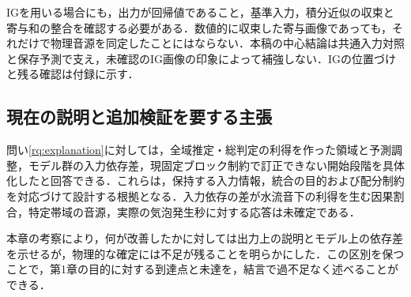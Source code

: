 IG\cite{sundararajan2017}を用いる場合にも，出力が回帰値であること，基準入力，積分近似の収束と寄与和の整合を確認する必要がある．数値的に収束した寄与画像であっても，それだけで物理音源を同定したことにはならない．本稿の中心結論は共通入力対照と保存予測で支え，未確認のIG画像の印象によって補強しない．IGの位置づけと残る確認は付録に示す．

\subsection{現在の説明と追加検証を要する主張}
問い\ref{rq:explanation}に対しては，全域推定・総判定の利得を作った領域と予測調整，モデル群の入力依存差，現固定ブロック制約で訂正できない開始段階を具体化したと回答できる．これらは，保持する入力情報，統合の目的および配分制約を対応づけて設計する根拠となる．入力依存の差が水流音下の利得を生む因果割合，特定帯域の音源，実際の気泡発生秒に対する応答は未確定である．


本章の考察により，何が改善したかに対しては出力上の説明とモデル上の依存差を示せるが，物理的な確定には不足が残ることを明らかにした．この区別を保つことで，第1章の目的に対する到達点と未達を，結言で過不足なく述べることができる．
